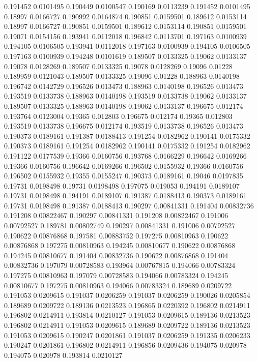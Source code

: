 0.191452 0.0101495
0.190449 0.0100547
0.190169 0.0113239
0.191452 0.0101495
0.18997 0.0166727
0.190992 0.0164874
0.190851 0.0159501
0.189612 0.0153114
0.18997 0.0166727
0.190851 0.0159501
0.189612 0.0153114
0.190851 0.0159501
0.19071 0.0154156
0.193941 0.0112018
0.196842 0.0113701
0.197163 0.0100939
0.194105 0.0106505
0.193941 0.0112018
0.197163 0.0100939
0.194105 0.0106505
0.197163 0.0100939
0.194248 0.0101619
0.189507 0.0133325
0.19062 0.0133137
0.19078 0.0128269
0.189507 0.0133325
0.19078 0.0128269
0.19096 0.01228
0.189959 0.0121043
0.189507 0.0133325
0.19096 0.01228
0.188963 0.0140198
0.196742 0.0142729
0.196526 0.013473
0.188963 0.0140198
0.196526 0.013473
0.193519 0.0133738
0.188963 0.0140198
0.193519 0.0133738
0.19062 0.0133137
0.189507 0.0133325
0.188963 0.0140198
0.19062 0.0133137
0.196675 0.012174
0.193764 0.0123004
0.19365 0.012803
0.196675 0.012174
0.19365 0.012803
0.193519 0.0133738
0.196675 0.012174
0.193519 0.0133738
0.196526 0.013473
0.190373 0.0189161
0.191387 0.0188413
0.191254 0.0182962
0.190141 0.0175332
0.190373 0.0189161
0.191254 0.0182962
0.190141 0.0175332
0.191254 0.0182962
0.191122 0.0177539
0.19366 0.0160756
0.193768 0.0166229
0.196642 0.0169266
0.19366 0.0160756
0.196642 0.0169266
0.196502 0.0155932
0.19366 0.0160756
0.196502 0.0155932
0.19355 0.0155247
0.190373 0.0189161
0.19046 0.0197835
0.19731 0.0198498
0.19731 0.0198498
0.197075 0.019053
0.194191 0.0189107
0.19731 0.0198498
0.194191 0.0189107
0.191387 0.0188413
0.190373 0.0189161
0.19731 0.0198498
0.191387 0.0188413
0.190297 0.00841331
0.191404 0.00832736
0.191208 0.00822467
0.190297 0.00841331
0.191208 0.00822467
0.191006 0.00792527
0.189781 0.00802749
0.190297 0.00841331
0.191006 0.00792527
0.190622 0.00876868
0.197581 0.00883752
0.197275 0.00810963
0.190622 0.00876868
0.197275 0.00810963
0.194245 0.00810677
0.190622 0.00876868
0.194245 0.00810677
0.191404 0.00832736
0.190622 0.00876868
0.191404 0.00832736
0.197079 0.00728583
0.193964 0.00767815
0.194066 0.00783324
0.197275 0.00810963
0.197079 0.00728583
0.194066 0.00783324
0.194245 0.00810677
0.197275 0.00810963
0.194066 0.00783324
0.189689 0.0209722
0.191053 0.0209615
0.191037 0.0206259
0.191037 0.0206259
0.190026 0.0205854
0.189689 0.0209722
0.189136 0.0213523
0.196865 0.0220392
0.196802 0.0214911
0.196802 0.0214911
0.193814 0.0210127
0.191053 0.0209615
0.189136 0.0213523
0.196802 0.0214911
0.191053 0.0209615
0.189689 0.0209722
0.189136 0.0213523
0.191053 0.0209615
0.190247 0.0201861
0.191037 0.0206259
0.191335 0.0206233
0.190247 0.0201861
0.196802 0.0214911
0.196856 0.0209436
0.194075 0.020978
0.194075 0.020978
0.193814 0.0210127
